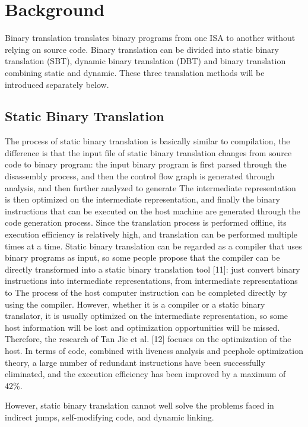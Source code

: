\section{Background}
\label{sec:background}

Binary translation translates binary programs from one ISA to another without relying on source code. 
Binary translation can be divided into static binary translation (SBT), dynamic binary translation (DBT) and binary translation combining static and dynamic. 
These three translation methods will be introduced separately below.

\subsection{Static Binary Translation}
The process of static binary translation is basically similar to compilation, the difference is that the input file of static binary translation changes from source code to binary program: 
the input binary program is first parsed through the disassembly process, and then the control flow graph is generated through analysis, and then further analyzed to generate The intermediate representation is then optimized on the intermediate representation, and finally the binary instructions that can be executed on the host machine are generated through the code generation process.
Since the translation process is performed offline, its execution efficiency is relatively high, and translation can be performed multiple times at a time.
Static binary translation can be regarded as a compiler that uses binary programs as input, so some people propose that the compiler can be directly transformed into a static binary translation tool [11]: 
just convert binary instructions into intermediate representations, from intermediate representations to The process of the host computer instruction can be completed directly by using the compiler. 
However, whether it is a compiler or a static binary translator, it is usually optimized on the intermediate representation, so some host information will be lost and optimization opportunities will be missed. 
Therefore, the research of Tan Jie et al. [12] focuses on the optimization of the host. 
In terms of code, combined with liveness analysis and peephole optimization theory, a large number of redundant instructions have been successfully eliminated, and the execution efficiency has been improved by a maximum of 42\%.

However, static binary translation cannot well solve the problems faced in indirect jumps, self-modifying code, and dynamic linking.

